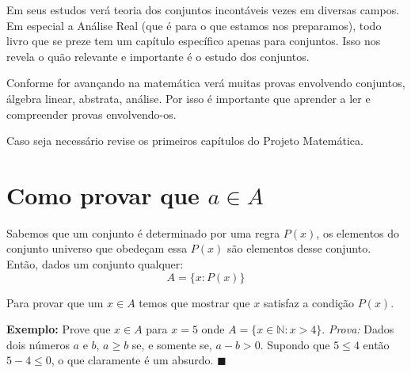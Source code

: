 \documentclass[main.tex]{subfiles}
\begin{document}
Em seus estudos verá teoria dos conjuntos incontáveis vezes em diversas campos. Em especial a Análise Real (que é para o que estamos nos preparamos), todo livro que se preze tem um capítulo específico apenas para conjuntos. Isso nos revela o quão relevante e importante é o estudo dos conjuntos.
\par 

Conforme for avançando na matemática verá muitas provas envolvendo conjuntos, álgebra linear, abstrata, análise. Por isso é importante que aprender a ler e compreender provas envolvendo-os.
\par 

Caso seja necessário revise os primeiros capítulos do Projeto Matemática.

\section{Como provar que $ a \in A $}
Sabemos que um conjunto é determinado por uma regra $P(x)$, os elementos do conjunto universo que obedeçam essa $P(x)$ são elementos desse conjunto. Então, dados um conjunto qualquer:
$$A = \{x: P(x)\}$$

Para provar que um $x \in A$ temos que mostrar que $x$ satisfaz a condição $P(x)$.

\textbf{Exemplo:} Prove que $x \in A$ para $x = 5$ onde $A = \lbrace x \in \mathbb{N}: x > 4\rbrace$.
\textit{Prova:} Dados dois números $a$ e $b$, $a \geq b$ se, e somente se, $a - b > 0$. Supondo que $5 \leq 4$ então $5 - 4 \leq 0$, o que claramente é um absurdo. $\blacksquare$
\end{document}
